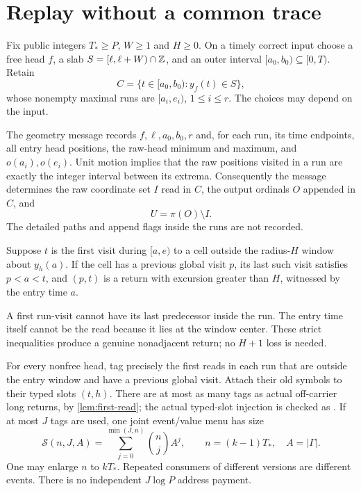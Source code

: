 \section{Replay without a common trace}\label{sec:replay}

Fix public integers $T_*\ge P$, $W\ge1$ and $H\ge0$. On a timely correct
input choose a free head $f$, a slab $S=[\ell,\ell+W)\cap\mathbb{Z}$, and an outer
interval $[a_0,b_0)\subseteq[0,T)$. Retain
\[
 C=\{t\in[a_0,b_0):y_f(t)\in S\},
\]
whose nonempty maximal runs are $[a_i,e_i)$, $1\le i\le r$. The choices may
depend on the input.

The geometry message records $f,\ell,a_0,b_0,r$ and, for each run, its time
endpoints, all entry head positions, the raw-head minimum and maximum, and
$o(a_i),o(e_i)$. Unit motion implies that the raw positions visited in a run
are exactly the integer interval between its extrema. Consequently the message
determines the raw coordinate set $I$ read in $C$, the output ordinals $O$
appended in $C$, and
\begin{equation}\label{eq:omitted}
 U=\pi(O)\setminus I.
\end{equation}
The detailed paths and append flags inside the runs are not recorded.

\begin{lemma}\label{lem:first-read}
Suppose $t$ is the first visit during $[a,e)$ to a cell outside the radius-$H$
window about $y_h(a)$. If the cell has a previous global visit $p$, its last
such visit satisfies $p<a<t$, and $(p,t)$ is a return with excursion greater
than $H$, witnessed by the entry time $a$.
\end{lemma}
\begin{outline}
A first run-visit cannot have its last predecessor inside the run. The entry
time itself cannot be the read because it lies at the window center. These
strict inequalities produce a genuine nonadjacent return; no $H+1$ loss is
needed.
\end{outline}

For every nonfree head, tag precisely the first reads in each run that are
outside the entry window and have a previous global visit. Attach their old
symbols to their typed slots $(t,h)$. There are at most as many tags as actual
off-carrier long returns, by \cref{lem:first-read}; the actual typed-slot
injection is checked as . If at most $J$ tags are
used, one joint event/value menu has size
\begin{equation}\label{eq:sparse}
 \mathcal S(n,J,A)=\sum_{j=0}^{\min(J,n)}\binom nj A^j,
 \qquad n=(k-1)T_*,\quad A=|\Gamma|.
\end{equation}
One may enlarge $n$ to $kT_*$. Repeated consumers of different versions are
different events. There is no independent $J\log P$ address payment.


